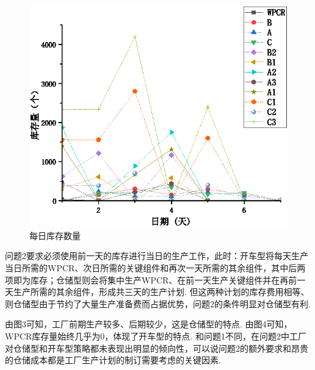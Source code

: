 \begin{figure}[!htbp]
	\centering
	\includegraphics{Image/问题二库存.eps}
	\caption{每日库存数量}\label{每日库存数量}
\end{figure}

问题2要求必须使用前一天的库存进行当日的生产工作，此时：开车型将每天生产当日所需的WPCR、次日所需的关键组件和再次一天所需的其余组件，其中后两项即为库存；仓储型则会将集中生产WPCR、在前一天生产关键组件并在再前一天生产所需的其余组件，形成共三天的生产计划.
但这两种计划的库存费用相等、则仓储型由于节约了大量生产准备费而占据优势，问题2的条件明显对仓储型有利.

由图3可知，工厂前期生产较多、后期较少，这是仓储型的特点.
由图4可知，WPCR库存量始终几乎为0，体现了开车型的特点.
和问题1不同，在问题2中工厂对仓储型和开车型策略都未表现出明显的倾向性，可以说问题2的额外要求和昂贵的仓储成本都是工厂生产计划的制订需要考虑的关键因素.

